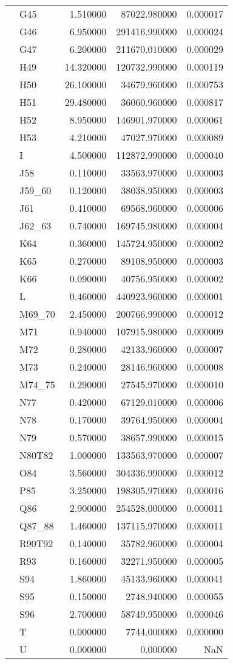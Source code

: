 \begin{tabular}{llrrr}
 & G45 & 1.510000 & 87022.980000 & 0.000017 \\
 & G46 & 6.950000 & 291416.990000 & 0.000024 \\
 & G47 & 6.200000 & 211670.010000 & 0.000029 \\
 & H49 & 14.320000 & 120732.990000 & 0.000119 \\
 & H50 & 26.100000 & 34679.960000 & 0.000753 \\
 & H51 & 29.480000 & 36060.960000 & 0.000817 \\
 & H52 & 8.950000 & 146901.970000 & 0.000061 \\
 & H53 & 4.210000 & 47027.970000 & 0.000089 \\
 & I & 4.500000 & 112872.990000 & 0.000040 \\
 & J58 & 0.110000 & 33563.970000 & 0.000003 \\
 & J59\_60 & 0.120000 & 38038.950000 & 0.000003 \\
 & J61 & 0.410000 & 69568.960000 & 0.000006 \\
 & J62\_63 & 0.740000 & 169745.980000 & 0.000004 \\
 & K64 & 0.360000 & 145724.950000 & 0.000002 \\
 & K65 & 0.270000 & 89108.950000 & 0.000003 \\
 & K66 & 0.090000 & 40756.950000 & 0.000002 \\
 & L & 0.460000 & 440923.960000 & 0.000001 \\
 & M69\_70 & 2.450000 & 200766.990000 & 0.000012 \\
 & M71 & 0.940000 & 107915.980000 & 0.000009 \\
 & M72 & 0.280000 & 42133.960000 & 0.000007 \\
 & M73 & 0.240000 & 28146.960000 & 0.000008 \\
 & M74\_75 & 0.290000 & 27545.970000 & 0.000010 \\
 & N77 & 0.420000 & 67129.010000 & 0.000006 \\
 & N78 & 0.170000 & 39764.950000 & 0.000004 \\
 & N79 & 0.570000 & 38657.990000 & 0.000015 \\
 & N80T82 & 1.000000 & 133563.970000 & 0.000007 \\
 & O84 & 3.560000 & 304336.990000 & 0.000012 \\
 & P85 & 3.250000 & 198305.970000 & 0.000016 \\
 & Q86 & 2.900000 & 254528.000000 & 0.000011 \\
 & Q87\_88 & 1.460000 & 137115.970000 & 0.000011 \\
 & R90T92 & 0.140000 & 35782.960000 & 0.000004 \\
 & R93 & 0.160000 & 32271.950000 & 0.000005 \\
 & S94 & 1.860000 & 45133.960000 & 0.000041 \\
 & S95 & 0.150000 & 2748.940000 & 0.000055 \\
 & S96 & 2.700000 & 58749.950000 & 0.000046 \\
 & T & 0.000000 & 7744.000000 & 0.000000 \\
 & U & 0.000000 & 0.000000 & NaN \\
\cline{1-5}
\bottomrule
\end{tabular}
